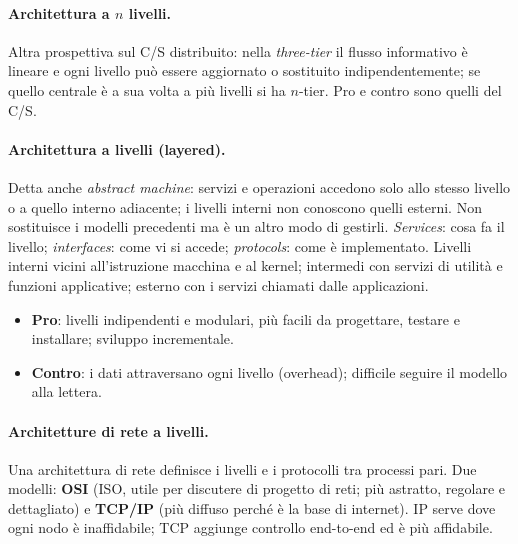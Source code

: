 \documentclass[a4paper,12pt]{article}
\begin{document}
\paragraph{Architettura a $n$ livelli.} Altra prospettiva sul C/S distribuito: nella
\emph{three-tier} il flusso informativo è lineare e ogni livello può essere aggiornato o
sostituito indipendentemente; se quello centrale è a sua volta a più livelli si ha
$n$-tier. Pro e contro sono quelli del C/S.

\paragraph{Architettura a livelli (layered).} Detta anche \emph{abstract machine}:
servizi e operazioni accedono solo allo stesso livello o a quello interno adiacente; i
livelli interni non conoscono quelli esterni. Non sostituisce i modelli precedenti ma è un
altro modo di gestirli. \emph{Services}: cosa fa il livello; \emph{interfaces}: come vi si
accede; \emph{protocols}: come è implementato. Livelli interni vicini all'istruzione
macchina e al kernel; intermedi con servizi di utilità e funzioni applicative; esterno con
i servizi chiamati dalle applicazioni.
\begin{itemize}
  \item \textbf{Pro}: livelli indipendenti e modulari, più facili da progettare, testare
        e installare; sviluppo incrementale.
  \item \textbf{Contro}: i dati attraversano ogni livello (overhead); difficile seguire
        il modello alla lettera.
\end{itemize}

\paragraph{Architetture di rete a livelli.} Una architettura di rete definisce i livelli
e i protocolli tra processi pari. Due modelli: \textbf{OSI} (ISO, utile per discutere di
progetto di reti; più astratto, regolare e dettagliato) e \textbf{TCP/IP} (più diffuso
perché è la base di internet). IP serve dove ogni nodo è inaffidabile; TCP aggiunge
controllo end-to-end ed è più affidabile.
\end{document}

